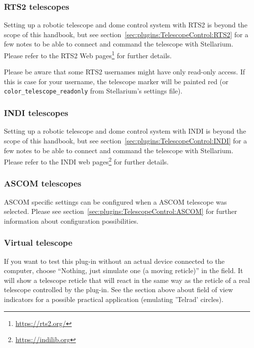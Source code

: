 \subsubsection{RTS2 telescopes}
Setting up a robotic telescope and dome control system with RTS2 
is beyond the scope of this handbook, but see section~\ref{sec:plugins:TelescopeControl:RTS2} 
for a few notes to be able to connect and command the telescope with Stellarium.
Please refer to the RTS2 Web pages\footnote{\url{https://rts2.org/}} for further details.

Please be aware that some RTS2 usernames might have only read-only access. If this is
case for your username, the telescope marker will be painted red (or
\texttt{color\_telescope\_readonly} from Stellarium's settings file).

\subsubsection{INDI telescopes}
Setting up a robotic telescope and dome control system with INDI 
is beyond the scope of this handbook, but see section~\ref{sec:plugins:TelescopeControl:INDI} 
for a few notes to be able to connect and command the telescope with Stellarium.
Please refer to the INDI web pages\footnote{\url{https://indilib.org}} for further details.

\subsubsection{ASCOM telescopes}
ASCOM specific settings can be configured when a ASCOM telescope was selected.
Please see section~\ref{sec:plugins:TelescopeControl:ASCOM} for further information about
configuration possibilities.

\subsubsection{Virtual telescope}
If you want to test this plug-in without an actual device connected to
the computer, choose ``Nothing, just simulate one (a moving reticle)'' in
the  field. It will show a telescope reticle
that will react in the same way as the reticle of a real telescope
controlled by the plug-in.  See the section above about field of view
indicators for a possible practical application (emulating 'Telrad'
circles).  



